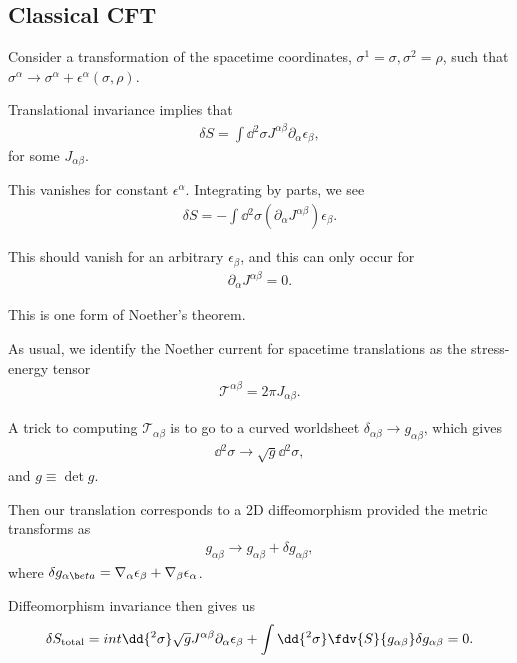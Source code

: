 \subsection{Classical CFT}

Consider a transformation of the spacetime coordinates, $\sigma^{1} = \sigma, \sigma^2 = \rho$, such that $\sigma^{\alpha} \to \sigma^{\alpha} + \epsilon^{\alpha } \left( \sigma, \rho \right)$.

Translational invariance implies that
\begin{align}
    \delta S = \int \dd{^2 \sigma} J^{\alpha \beta} \partial_\alpha \epsilon_\beta
,\end{align}
for some $J_{\alpha \beta}$.

This vanishes for constant $\epsilon^{\alpha}$. Integrating by parts, we see
\begin{align}
    \delta S = -\int \dd{^2 \sigma} \left( \partial_\alpha J^{\alpha \beta} \right) \epsilon_\beta
.\end{align}

This should vanish for an arbitrary $\epsilon_\beta$, and this can only occur for
\begin{align}
    \partial_\alpha J^{\alpha \beta} = 0
.\end{align}

This is one form of Noether's theorem.

As usual, we identify the Noether current for spacetime translations as the stress-energy tensor
\begin{align}
    \mathcal{T}^{\alpha \beta} = 2 \pi J_{\alpha \beta}
.\end{align}

A trick to computing $\mathcal{T}_{\alpha \beta}$ is to go to a curved worldsheet $\delta_{\alpha \beta} \to g_{\alpha \beta}$, which gives
\begin{align}
    \dd{^2\sigma} \to \sqrt{g} \dd{^2 \sigma}
,\end{align}
and $g \equiv \det g$.

Then our translation corresponds to a 2D diffeomorphism provided the metric transforms as 
\begin{align}
    g_{\alpha \beta} \to g_{\alpha \beta} + \delta g_{\alpha \beta}
,\end{align}
where $\delta g_{\alpha \b eta} = \nabla_{\alpha} \epsilon_\beta + \nabla_{\beta} \epsilon_\alpha$.

Diffeomorphism invariance then gives us
\begin{align}
    \delta S_\text{total} = int \dd{^2 \sigma} \sqrt{g}  J^{\alpha \beta} \partial_\alpha \epsilon_\beta + \int \dd{^2\sigma} \fdv{S}{g_{\alpha \beta}} \delta g_{\alpha \beta} = 0
.\end{align}

